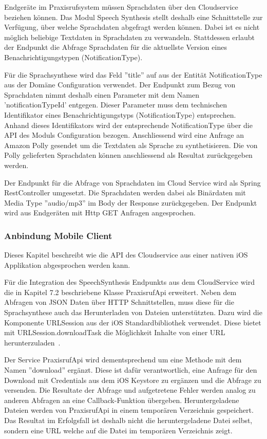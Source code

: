 Endgeräte im Praxisrufsystem müssen Sprachdaten über den Cloudservice beziehen können.
Das Modul Speech Synthesis stellt deshalb eine Schnittstelle zur Verfügung, über welche Sprachdaten abgefragt werden können.
Dabei ist es nicht möglich beliebige Textdaten in Sprachdaten zu verwandeln.
Stattdessen erlaubt der Endpunkt die Abfrage Sprachdaten für die aktuellste Version eines Benachrichtigungstypen (NotificationType).

Für die Sprachsynthese wird das Feld ''title'' auf aus der Entität NotificationType aus der Domäne Configuration verwendet.
Der Endpunkt zum Bezug von Sprachdaten nimmt deshalb einen Parameter mit dem Namen 'notificationTypeId' entgegen.
Dieser Parameter muss dem technischen Identifikator eines Benachrichtigungstyps (NotificationType) entsprechen.
Anhand dieses Identifikators wird der entsprechende NotificationType über die API des Moduls Configuration bezogen.
Anschliessend wird eine Anfrage an Amazon Polly gesendet um die Textdaten als Sprache zu synthetisieren.
Die von Polly gelieferten Sprachdaten können anschliessend als Resultat zurückgegeben werden.

Der Endpunkt für die Abfrage von Sprachdaten im Cloud Service wird als Spring RestController umgesetzt.
Die Sprachdaten werden dabei als Binärdaten mit Media Type ''audio/mp3'' im Body der Response zurückgegeben.
Der Endpunkt wird aus Endgeräten mit Http GET Anfragen angesprochen.

\clearpage
\subsubsection{Anbindung Mobile Client}

Dieses Kapitel beschreibt wie die API des Cloudservice aus einer nativen iOS Applikation abgesprochen werden kann.

Für die Integration des SpeechSynthesis Endpunkts aus dem CloudService wird die in Kapitel 7.2 beschriebene Klasse PraxisrufApi erweitert.
Neben dem Abfragen von JSON Daten über HTTP Schnittstellen, muss diese für die Sprachsynthese auch das Herunterladen von Dateien unterstützten.
Dazu wird die Komponente URLSession aus der iOS Standardbibliothek verwendet.
Diese bietet mit URLSession.downloadTask die Möglichkeit Inhalte von einer URL herunterzuladen~\cite{ios_downloadtask}.

Der Service PraxisrufApi wird dementsprechend um eine Methode mit dem Namen ''download'' ergänzt.
Diese ist dafür verantwortlich, eine Anfrage für den Download mit Credentials aus dem iOS Keystore zu ergänzen und die Abfrage zu versenden.
Die Resultate der Abfrage und aufgetretene Fehler werden analog zu anderen Abfragen an eine Callback-Funktion übergeben.
Heruntergeladene Dateien werden von PraxisrufApi in einem temporären Verzeichnis gespeichert.
Das Resultat im Erfolgsfall ist deshalb nicht die heruntergeladene Datei selbst, sondern eine URL welche auf die Datei im temporären Verzeichnis zeigt.


